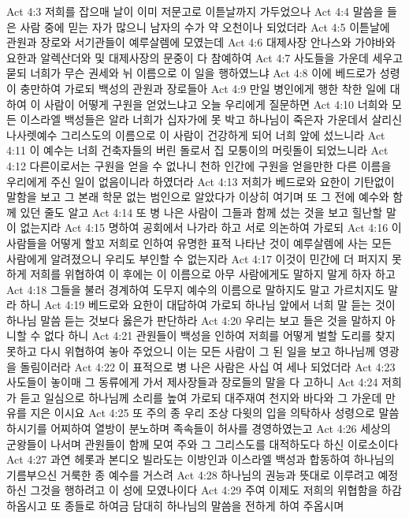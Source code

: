 Act 4:3  저희를 잡으매 날이 이미 저문고로 이튿날까지 가두었으나
Act 4:4  말씀을 들은 사람 중에 믿는 자가 많으니 남자의 수가 약 오천이나 되었더라
Act 4:5  이튿날에 관원과 장로와 서기관들이 예루살렘에 모였는데
Act 4:6  대제사장 안나스와 가야바와 요한과 알렉산더와 및 대제사장의 문중이 다 참예하여
Act 4:7  사도들을 가운데 세우고 묻되 너희가 무슨 권세와 뉘 이름으로 이 일을 행하였느냐
Act 4:8  이에 베드로가 성령이 충만하여 가로되 백성의 관원과 장로들아
Act 4:9  만일 병인에게 행한 착한 일에 대하여 이 사람이 어떻게 구원을 얻었느냐고 오늘 우리에게 질문하면
Act 4:10  너희와 모든 이스라엘 백성들은 알라 너희가 십자가에 못 박고 하나님이 죽은자 가운데서 살리신 나사렛예수 그리스도의 이름으로 이 사람이 건강하게 되어 너희 앞에 섰느니라
Act 4:11  이 예수는 너희 건축자들의 버린 돌로서 집 모퉁이의 머릿돌이 되었느니라
Act 4:12  다른이로서는 구원을 얻을 수 없나니 천하 인간에 구원을 얻을만한 다른 이름을 우리에게 주신 일이 없음이니라 하였더라
Act 4:13  저희가 베드로와 요한이 기탄없이 말함을 보고 그 본래 학문 없는 범인으로 알았다가 이상히 여기며 또 그 전에 예수와 함께 있던 줄도 알고
Act 4:14  또 병 나은 사람이 그들과 함께 섰는 것을 보고 힐난할 말이 없는지라
Act 4:15  명하여 공회에서 나가라 하고 서로 의논하여 가로되
Act 4:16  이 사람들을 어떻게 할꼬 저희로 인하여 유명한 표적 나타난 것이 예루살렘에 사는 모든 사람에게 알려졌으니 우리도 부인할 수 없는지라
Act 4:17  이것이 민간에 더 퍼지지 못하게 저희를 위협하여 이 후에는 이 이름으로 아무 사람에게도 말하지 말게 하자 하고
Act 4:18  그들을 불러 경계하여 도무지 예수의 이름으로 말하지도 말고 가르치지도 말라 하니
Act 4:19  베드로와 요한이 대답하여 가로되 하나님 앞에서 너희 말 듣는 것이 하나님 말씀 듣는 것보다 옳은가 판단하라
Act 4:20  우리는 보고 들은 것을 말하지 아니할 수 없다 하니
Act 4:21  관원들이 백성을 인하여 저희를 어떻게 벌할 도리를 찾지 못하고 다시 위협하여 놓아 주었으니 이는 모든 사람이 그 된 일을 보고 하나님께 영광을 돌림이러라
Act 4:22  이 표적으로 병 나은 사람은 사십 여 세나 되었더라
Act 4:23  사도들이 놓이매 그 동류에게 가서 제사장들과 장로들의 말을 다 고하니
Act 4:24  저희가 듣고 일심으로 하나님께 소리를 높여 가로되 대주재여 천지와 바다와 그 가운데 만유를 지은 이시요
Act 4:25  또 주의 종 우리 조상 다윗의 입을 의탁하사 성령으로 말씀하시기를 어찌하여 열방이 분노하며 족속들이 허사를 경영하였는고
Act 4:26  세상의 군왕들이 나서며 관원들이 함께 모여 주와 그 그리스도를 대적하도다 하신 이로소이다
Act 4:27  과연 헤롯과 본디오 빌라도는 이방인과 이스라엘 백성과 합동하여 하나님의 기름부으신 거룩한 종 예수를 거스려
Act 4:28  하나님의 권능과 뜻대로 이루려고 예정하신 그것을 행하려고 이 성에 모였나이다
Act 4:29  주여 이제도 저희의 위협함을 하감하옵시고 또 종들로 하여금 담대히 하나님의 말씀을 전하게 하여 주옵시며
